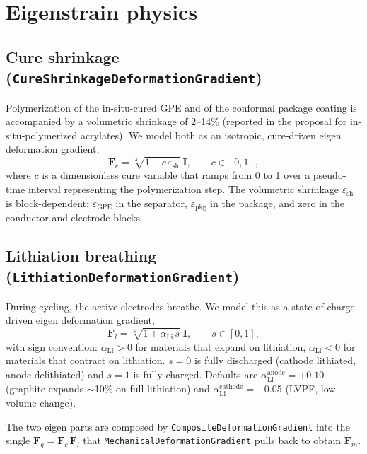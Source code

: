 \documentclass[11pt,letterpaper]{article}
\begin{document}
\section{Eigenstrain physics}

\subsection{Cure shrinkage (\texttt{CureShrinkageDeformationGradient})}

Polymerization of the in-situ-cured GPE and of the conformal package
coating is accompanied by a volumetric shrinkage of 2--14\%
(reported in the proposal for in-situ-polymerized acrylates).  We model
both as an isotropic, cure-driven eigen deformation
gradient,
\begin{equation}
\mathbf{F}_c = \sqrt[3]{1 - c\,\varepsilon_{\text{sh}}}\;\mathbf{I},
\qquad c \in [0,1],
\end{equation}
where $c$ is a dimensionless cure variable that ramps from 0 to 1 over a
pseudo-time interval representing the polymerization step.  The
volumetric shrinkage $\varepsilon_{\text{sh}}$ is block-dependent:
$\varepsilon_{\text{GPE}}$ in the separator, $\varepsilon_{\text{pkg}}$ in
the package, and zero in the conductor and electrode blocks.

\subsection{Lithiation breathing (\texttt{LithiationDeformationGradient})}

During cycling, the active electrodes breathe.  We model this as a
state-of-charge-driven eigen deformation gradient,
\begin{equation}
\mathbf{F}_l = \sqrt[3]{1 + \alpha_{\text{Li}}\,s}\;\mathbf{I},
\qquad s \in [0,1] ,
\end{equation}
with sign convention: $\alpha_{\text{Li}} > 0$ for materials that expand
on lithiation, $\alpha_{\text{Li}} < 0$ for materials that contract on
lithiation.  $s = 0$ is fully discharged (cathode lithiated, anode
delithiated) and $s = 1$ is fully charged.  Defaults are
$\alpha_{\text{Li}}^{\text{anode}} = +0.10$ (graphite expands
$\sim$10\% on full lithiation) and $\alpha_{\text{Li}}^{\text{cathode}}
= -0.05$ (LVPF, low-volume-change).

The two eigen parts are composed by
\texttt{CompositeDeformationGradient} into the single
$\mathbf{F}_g = \mathbf{F}_c\,\mathbf{F}_l$ that
\texttt{MechanicalDeformationGradient} pulls back to obtain
$\mathbf{F}_m$.
\end{document}
